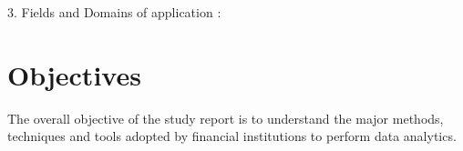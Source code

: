 3. Fields and Domains of application :



\section{Objectives}

The overall objective of the study report is to understand the major methods, techniques and tools adopted by financial institutions to perform data analytics.






\FloatBarrier
